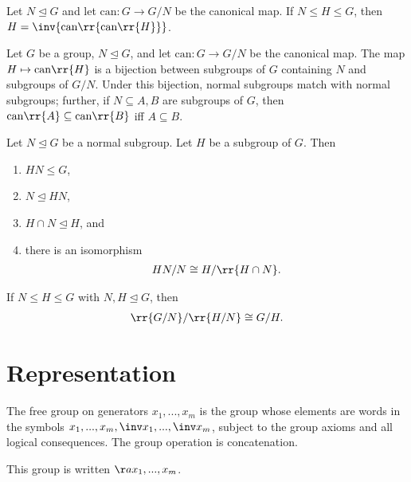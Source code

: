 \documentclass{article}
\begin{document}
\begin{proposition}
	Let $N\trianglelefteq G$ and let $\text{can}:G\to G/N$ be the canonical map. If $N\leq H\leq G$,
	then $H=\inv{\text{can}\rr{\text{can}\rr{H}}}$.
\end{proposition}

\begin{theorem}[Correspondence]
	\label{thm:correspondence}
	Let $G$ be a group, $N\trianglelefteq G$, and let $\text{can}:G\to G/N$ be the canonical map.
	The map $H\mapsto\text{can}\rr{H}$ is a bijection between subgroups of $G$ containing $N$ and
	subgroups of $G/N$. Under this bijection, normal subgroups match with normal subgroups; further,
	if $N\subseteq A,B$ are subgroups of $G$, then $\text{can}\rr{A}\subseteq\text{can}\rr{B}$
	iff $A\subseteq B$.
\end{theorem}

\begin{theorem}
	\label{thm:second-iso-theorem}
	Let $N\trianglelefteq G$ be a normal subgroup. Let $H$ be a subgroup of $G$. Then
	\begin{enumerate}
		\item $HN\leq G$,
		\item $N\trianglelefteq HN$,
		\item $H\cap N\trianglelefteq H$, and
		\item there is an isomorphism \begin{align*}
			      HN/N \cong H/\rr{H\cap N}.
		      \end{align*}
	\end{enumerate}
\end{theorem}

\begin{theorem}
	\label{thm:third-iso-theorem}
	If $N\leq H\leq G$ with $N,H\trianglelefteq G$, then \begin{align*}
		\rr{G/N}/\rr{H/N}\cong G/H.
	\end{align*}
\end{theorem}

\section{Representation}
\label{sec:representation}

\begin{definition}
	\label{def:free-group}
	The free group on generators $x_1,...,x_m$ is the group whose elements are words in the
	symbols $x_1,...,x_m,\inv x_1, ...,\inv x_m$, subject to the group axioms and all logical
	consequences. The group operation is concatenation.

	This group is written $\aa{x_1,...,x_m}$.
\end{definition}
\end{document}
